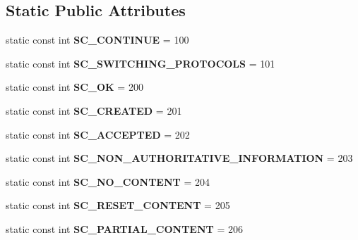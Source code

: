 \subsection*{Static Public Attributes}
\begin{DoxyCompactItemize}
\item 
\mbox{\label{class_response_a3c13b196fd52116f84fb9c1df15041f5}} 
static const int {\bfseries S\+C\+\_\+\+C\+O\+N\+T\+I\+N\+UE} = 100
\item 
\mbox{\label{class_response_a9509039bba1450da8a7828a692a38ae5}} 
static const int {\bfseries S\+C\+\_\+\+S\+W\+I\+T\+C\+H\+I\+N\+G\+\_\+\+P\+R\+O\+T\+O\+C\+O\+LS} = 101
\item 
\mbox{\label{class_response_a290c49b3bab45fc87c778b931df89685}} 
static const int {\bfseries S\+C\+\_\+\+OK} = 200
\item 
\mbox{\label{class_response_a13f4c7b9b889ed6696a1df400e9adb27}} 
static const int {\bfseries S\+C\+\_\+\+C\+R\+E\+A\+T\+ED} = 201
\item 
\mbox{\label{class_response_a1aa859ddf470694a40ca25014b1e2e8d}} 
static const int {\bfseries S\+C\+\_\+\+A\+C\+C\+E\+P\+T\+ED} = 202
\item 
\mbox{\label{class_response_af586207068c38ee6296ab291368af0fd}} 
static const int {\bfseries S\+C\+\_\+\+N\+O\+N\+\_\+\+A\+U\+T\+H\+O\+R\+I\+T\+A\+T\+I\+V\+E\+\_\+\+I\+N\+F\+O\+R\+M\+A\+T\+I\+ON} = 203
\item 
\mbox{\label{class_response_a433e0a950ab7d134490fbc310d16dc2c}} 
static const int {\bfseries S\+C\+\_\+\+N\+O\+\_\+\+C\+O\+N\+T\+E\+NT} = 204
\item 
\mbox{\label{class_response_aa7e14d951f72316cb43507e973d53581}} 
static const int {\bfseries S\+C\+\_\+\+R\+E\+S\+E\+T\+\_\+\+C\+O\+N\+T\+E\+NT} = 205
\item 
\mbox{\label{class_response_a14c60b047c79a62992f0e8ae08aef23c}} 
static const int {\bfseries S\+C\+\_\+\+P\+A\+R\+T\+I\+A\+L\+\_\+\+C\+O\+N\+T\+E\+NT} = 206
\item 

\end{DoxyCompactItemize}
